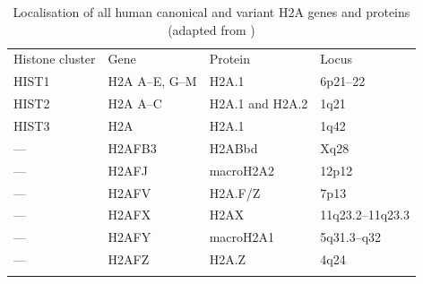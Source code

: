 \documentclass[graybox]{svmult}
\begin{document}
\newpage




\newpage

\begin{table}
\caption{Localisation of all human canonical and variant H2A genes and proteins (adapted from \protect{})}
\label{tab:H2A-localisation}
\begin{tabular}{p{2.82cm}p{2.82cm}p{2.82cm}p{2.82cm}}
\hline\noalign{\smallskip}
Histone cluster & Gene & Protein & Locus  \\
\noalign{\smallskip}\svhline\noalign{\smallskip}
HIST1 & H2A A--E, G--M  & H2A.1           & 6p21--22\\
HIST2 & H2A A--C        & H2A.1 and H2A.2 & 1q21\\
HIST3 & H2A             & H2A.1           & 1q42\\
---   & H2AFB3          & H2ABbd          & Xq28\\
---   & H2AFJ           & macroH2A2       & 12p12\\
---   & H2AFV           & H2A.F/Z         & 7p13\\
---   & H2AFX           & H2AX            & 11q23.2--11q23.3\\
---   & H2AFY           & macroH2A1       & 5q31.3--q32\\
---   & H2AFZ           & H2A.Z           & 4q24\\
\noalign{\smallskip}\hline\noalign{\smallskip}
\end{tabular}
\end{table}

\newpage
\end{document}
